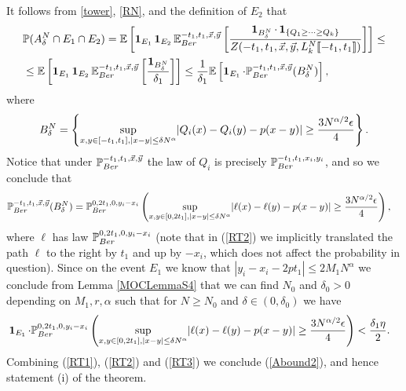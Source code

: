 It follows from \eqref{tower}, \eqref{RN}, and the definition of $E_2$ that
\begin{equation}\label{RT1}
\begin{split}
&\mathbb{P}(A^N_\delta\cap E_1\cap E_2) =\mathbb{E}\left[\operatorname{\mathbf{1}}_{E_1}\operatorname{\mathbf{1}}_{E_2} \mathbb{E}_{Ber}^{-t_1, t_1,\vec x,\vec y}\left[\frac{\operatorname{\mathbf{1}}_{B^N_\delta}\cdot \operatorname{\mathbf{1}}_{\left\{Q_1\geq\cdots\geq Q_{k}\right\}}}{Z(-t_1,t_1,\vec x, \vec y, L^N_{k} \llbracket -t_1, t_1 \rrbracket)}\right]\right] \leq \\
&\leq \mathbb{E}\left[\operatorname{\mathbf{1}}_{E_1}\operatorname{\mathbf{1}}_{E_2}\mathbb{E}_{Ber}^{-t_1,t_1,\vec x,\vec y}\left[\frac{\operatorname{\mathbf{1}}_{B^N_\delta}}{\delta_1}\right]\right] \leq \frac{1}{\delta_1} \mathbb{E}\left[ \operatorname{\mathbf{1}}_{E_1} \cdot\mathbb{P}_{Ber}^{-t_1,t_1,\vec{x}, \vec{y} }(B^N_\delta) \right],
\end{split}
\end{equation}
where 
$$B^N_\delta = \left\{\sup_{{x,y\in [-t_1,t_1], |x-y|\leq \delta N^\alpha}} \abs*{Q_i(x)-Q_i(y)-p(x-y)}\geq \frac{3N^{\alpha/2}\epsilon}4\right\}.$$
Notice that under $\mathbb{P}_{Ber}^{-t_1,t_1,\vec{x}, \vec{y} }$ the law of $Q_i$ is precisely $\mathbb{P}_{Ber}^{-t_1,t_1,x_i, y_i }$, and so we conclude that 
\begin{equation}\label{RT2}
\begin{split}
& \pr_{Ber}^{-t_1,t_1,\vec{x}, \vec{y} }(B^N_\delta) = \pr_{Ber}^{0,2t_1,0, y_i - x_i }\left( \sup_{{x,y\in [0,2t_1], |x-y|\leq \delta N^\alpha}} \abs*{\ell(x)-\ell(y)-p(x-y)}\geq \frac{3N^{\alpha/2}\epsilon}4  \right),
\end{split}
\end{equation}
where $\ell$ has law $\mathbb{P}_{Ber}^{0,2t_1,0, y_i - x_i }$ (note that in (\ref{RT2}) we implicitly translated the path $\ell$ to the right by $t_1$ and up by $-x_i$, which does not affect the probability in question). Since on the event $E_1$ we know that $|y_i -x_i - 2 p t_1| \leq 2M_1 N^{\alpha}$  we conclude from Lemma \ref{MOCLemmaS4} that we can find $N_0$ and $\delta_0 > 0$ depending on $M_1, r, \alpha$ such that for $N \geq N_0$ and $\delta \in (0, \delta_0)$ we have
\begin{equation}\label{RT3}
\begin{split}
& \indic_{E_1} \cdot \pr_{Ber}^{0,2t_1,0, y_i - x_i }\left( \sup_{{x,y\in [0,2t_1], |x-y|\leq \delta N^\alpha}} \abs*{\ell(x)-\ell(y)-p(x-y)}\geq \frac{3N^{\alpha/2}\epsilon}4  \right) < \frac{\delta_1 \eta}{2}.
\end{split}
\end{equation}
Combining (\ref{RT1}), (\ref{RT2}) and (\ref{RT3}) we conclude (\ref{Abound2}), and hence statement (i) of the theorem.


